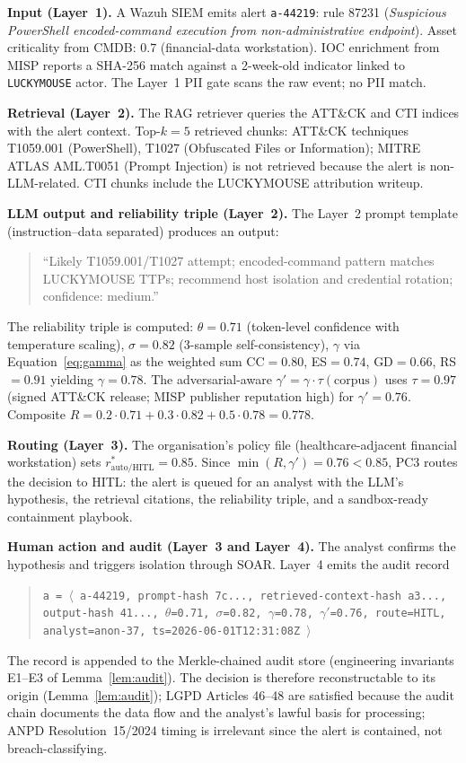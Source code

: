 \documentclass[preprint,12pt,authoryear]{elsarticle}
\begin{document}
\textbf{Input (Layer~1).} A Wazuh SIEM emits alert \texttt{a-44219}: rule 87231 (\emph{Suspicious PowerShell encoded-command execution from non-administrative endpoint}). Asset criticality from CMDB: $0.7$ (financial-data workstation). IOC enrichment from MISP reports a SHA-256 match against a 2-week-old indicator linked to \texttt{LUCKYMOUSE} actor. The Layer~1 PII gate scans the raw event; no PII match.

\textbf{Retrieval (Layer~2).} The RAG retriever queries the ATT\&CK and CTI indices with the alert context. Top-$k = 5$ retrieved chunks: ATT\&CK techniques T1059.001 (PowerShell), T1027 (Obfuscated Files or Information); MITRE ATLAS AML.T0051 (Prompt Injection) is not retrieved because the alert is non-LLM-related. CTI chunks include the LUCKYMOUSE attribution writeup.

\textbf{LLM output and reliability triple (Layer~2).} The Layer~2 prompt template (instruction--data separated) produces an output:
\begin{quote}\small
``Likely T1059.001/T1027 attempt; encoded-command pattern matches LUCKYMOUSE TTPs; recommend host isolation and credential rotation; confidence: medium.''
\end{quote}
The reliability triple is computed: $\theta = 0.71$ (token-level confidence with temperature scaling), $\sigma = 0.82$ (3-sample self-consistency), $\gamma$ via Equation~\ref{eq:gamma} as the weighted sum CC$=0.80$, ES$=0.74$, GD$=0.66$, RS$=0.91$ yielding $\gamma = 0.78$. The adversarial-aware $\gamma' = \gamma \cdot \tau(\text{corpus})$ uses $\tau = 0.97$ (signed ATT\&CK release; MISP publisher reputation high) for $\gamma' = 0.76$. Composite $R = 0.2 \cdot 0.71 + 0.3 \cdot 0.82 + 0.5 \cdot 0.78 = 0.778$.

\textbf{Routing (Layer~3).} The organisation's policy file (healthcare-adjacent financial workstation) sets $r^*_{\text{auto/HITL}} = 0.85$. Since $\min(R, \gamma') = 0.76 < 0.85$, PC3 routes the decision to HITL: the alert is queued for an analyst with the LLM's hypothesis, the retrieval citations, the reliability triple, and a sandbox-ready containment playbook.

\textbf{Human action and audit (Layer~3 and Layer~4).} The analyst confirms the hypothesis and triggers isolation through SOAR. Layer~4 emits the audit record
\begin{quote}\small
\texttt{a = $\langle$ a-44219, prompt-hash 7c..., retrieved-context-hash a3..., output-hash 41..., $\theta$=0.71, $\sigma$=0.82, $\gamma$=0.78, $\gamma'$=0.76, route=HITL, analyst=anon-37, ts=2026-06-01T12:31:08Z $\rangle$}
\end{quote}
The record is appended to the Merkle-chained audit store (engineering invariants E1--E3 of Lemma~\ref{lem:audit}). The decision is therefore reconstructable to its origin (Lemma~\ref{lem:audit}); LGPD Articles 46--48 are satisfied because the audit chain documents the data flow and the analyst's lawful basis for processing; ANPD Resolution~15/2024 timing is irrelevant since the alert is contained, not breach-classifying.
\end{document}
